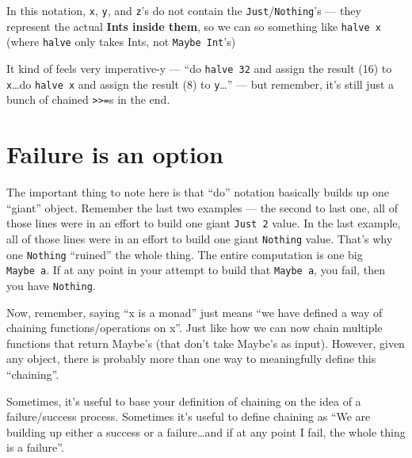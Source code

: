 \documentclass[]{article}
\begin{document}
In this notation, \texttt{x}, \texttt{y}, and \texttt{z}'s do not contain the
\texttt{Just}/\texttt{Nothing}'s --- they represent the actual \textbf{Ints
inside them}, so we can so something like \texttt{halve\ x} (where
\texttt{halve} only takes Ints, not \texttt{Maybe\ Int}'s)

It kind of feels very imperative-y --- ``do \texttt{halve\ 32} and assign the
result (16) to \texttt{x}\ldots do \texttt{halve\ x} and assign the result (8)
to \texttt{y}\ldots{}'' --- but remember, it's still just a bunch of chained
\texttt{\textgreater{}\textgreater{}=}s in the end.

\section{Failure is an option}\label{failure-is-an-option}

The important thing to note here is that ``do'' notation basically builds up one
``giant'' object. Remember the last two examples --- the second to last one, all
of those lines were in an effort to build one giant \texttt{Just\ 2} value. In
the last example, all of those lines were in an effort to build one giant
\texttt{Nothing} value. That's why one \texttt{Nothing} ``ruined'' the whole
thing. The entire computation is one big \texttt{Maybe\ a}. If at any point in
your attempt to build that \texttt{Maybe\ a}, you fail, then you have
\texttt{Nothing}.

Now, remember, saying ``x is a monad'' just means ``we have defined a way of
chaining functions/operations on x''. Just like how we can now chain multiple
functions that return Maybe's (that don't take Maybe's as input). However, given
any object, there is probably more than one way to meaningfully define this
``chaining''.

Sometimes, it's useful to base your definition of chaining on the idea of a
failure/success process. Sometimes it's useful to define chaining as ``We are
building up either a success or a failure\ldots and if at any point I fail, the
whole thing is a failure''.
\end{document}

